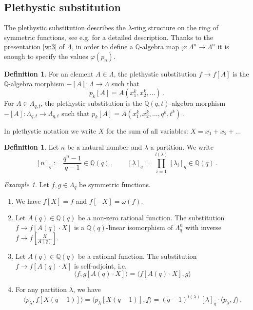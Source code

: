 \documentclass[12pt,a4paper]{amsart}
\theoremstyle{plain}
\theoremstyle{definition}
\newtheorem{df}[tw]{Definition}
\theoremstyle{remark}
\newtheorem{ex}[tw]{Example}
\newcommand{\QQ}{\mathbb{Q}}
\newcommand{\Partq}[1]{[{#1}]_q}
\begin{document}
\subsection{Plethystic substitution}
The plethystic substitution describes the $\lambda$-ring structure on the ring of symmetric functions, see e.g. \cite{plethysm} for a detailed description. Thanks to the presentation \eqref{w:3} of $\Lambda$, in order to define a $\QQ$-algebra map $\varphi:\Lambda^n\to\Lambda^n$ it is enough to specify the values $\varphi(p_n)$.
\begin{df}
	For an element $A\in \Lambda$, the plethystic substitution $f \to f[A]$ is the $\QQ$-algebra morphism $-[A]:\Lambda\to\Lambda$ such that
	$$p_k[A]=A(x_1^k,x_2^k,\dots)\,.$$
	For $A\in \Lambda_{q,t}$, the plethystic substitution is the $\QQ(q,t)$-algebra morphism $-[A]:\Lambda_{q,t}\to\Lambda_{q,t}$ such that $p_k[A]=A(x_1^k,x_2^k,\dots,q^k,t^k)\,.$
\end{df}
\noindent In plethystic notation we write $X$ for the sum of all variables: $X=x_1+x_2+\dots$
\begin{df} \label{df:partq}
	Let $n$ be a natural number and $\lambda$ a partition. We write
	$$[n]_q:=\frac{q^n-1}{q-1}\in\QQ(q)\,,\qquad \Partq{\lambda}:=\prod_{i=1}^{l({\lambda})} [{\lambda}_i]_q\in\QQ(q)\,.$$
\end{df}
\begin{ex} \label{ex:plethysm}
	Let $f,g\in \Lambda_q$ be symmetric functions.
	\begin{enumerate}
		\item We have $f[X]=f$ and $f[-X]=\omega(f)$.
		\item Let $A(q)\in \QQ(q)$ be a non-zero rational function. The substitution $f\to f[A(q)\cdot X]$ is a $\QQ(q)$-linear isomorphism of $\Lambda^n_q$ with inverse \hbox{$f\to f[\frac{X}{A(q)}]$.}
		\item Let $A(q)\in \QQ(q)$ be a rational function. The substitution $f\to f[A(q)\cdot X]$ is self-adjoint, i.e.
		$$\langle f,g[A(q)\cdot X]\rangle= \langle f[A(q)\cdot X],g\rangle $$
		\item For any partition $\lambda$, we have
		$$\langle p_\lambda,f[X(q-1)]\rangle=\langle p_\lambda[X(q-1)],f\rangle=(q-1)^{l(\lambda)}\Partq{\lambda}\cdot\langle p_\lambda,f\rangle \,.$$
	\end{enumerate}
\end{ex}
\end{document}
